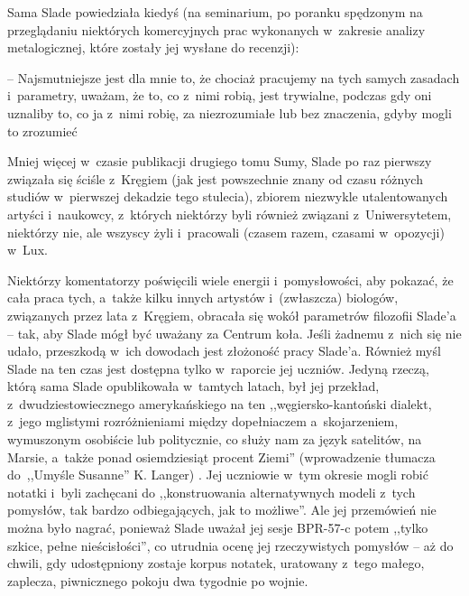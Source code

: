 \documentclass[oneside,polish,11pt,rmheadings]{mwbk}
\begin{document}
Sama Slade powiedziała kiedyś (na seminarium, po poranku spędzonym na przeglądaniu niektórych komercyjnych prac wykonanych w~zakresie analizy metalogicznej, które zostały jej wysłane do recenzji): 

-- Najsmutniejsze jest dla mnie to, że chociaż pracujemy na tych samych zasadach i~parametry, uważam, że to, co z~nimi robią, jest trywialne, podczas gdy oni uznaliby to, co ja z~nimi robię, za niezrozumiałe lub bez znaczenia, gdyby mogli to zrozumieć 

Mniej więcej w~czasie publikacji drugiego tomu Sumy, Slade po raz pierwszy związała się ściśle z~Kręgiem (jak jest powszechnie znany od czasu różnych studiów w~pierwszej dekadzie tego stulecia), zbiorem niezwykle utalentowanych artyści i~naukowcy, z~których niektórzy byli również związani z~Uniwersytetem, niektórzy nie, ale wszyscy żyli i~pracowali (czasem razem, czasami w~opozycji) w~Lux. 

Niektórzy komentatorzy poświęcili wiele energii i~pomysłowości, aby pokazać, że cała praca tych, a~także kilku innych artystów i~(zwłaszcza) biologów, związanych przez lata z~Kręgiem, obracała się wokół parametrów filozofii Slade'a -- tak, aby Slade mógł być uważany za Centrum koła. Jeśli żadnemu z~nich się nie udało, przeszkodą w~ich dowodach jest złożoność pracy Slade'a. Również myśl Slade na ten czas jest dostępna tylko w~raporcie jej uczniów. Jedyną rzeczą, którą sama Slade opublikowała w~tamtych latach, był jej przekład, z~dwudziestowiecznego amerykańskiego na ten ,,węgiersko-kantoński dialekt, z~jego mglistymi rozróżnieniami między dopełniaczem a~skojarzeniem, wymuszonym osobiście lub politycznie, co służy nam za język satelitów, na Marsie, a~także ponad osiemdziesiąt procent Ziemi'' (wprowadzenie tłumacza do~,,Umyśle Susanne'' K. Langer) . Jej uczniowie w~tym okresie mogli robić notatki i~byli zachęcani do ,,konstruowania alternatywnych modeli z~tych pomysłów, tak bardzo odbiegających, jak to możliwe''. Ale jej przemówień nie można było nagrać, ponieważ Slade uważał jej sesje BPR-57-c potem ,,tylko szkice, pełne nieścisłości'', co utrudnia ocenę jej rzeczywistych pomysłów -- aż do chwili, gdy udostępniony zostaje korpus notatek, uratowany z~tego małego, zaplecza, piwnicznego pokoju dwa tygodnie po wojnie. 
\end{document}
